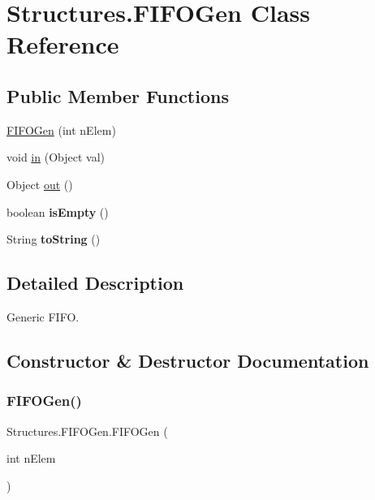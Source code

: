 \hypertarget{class_structures_1_1_f_i_f_o_gen}{}\section{Structures.\+F\+I\+F\+O\+Gen Class Reference}
\label{class_structures_1_1_f_i_f_o_gen}
\subsection*{Public Member Functions}
\begin{DoxyCompactItemize}
\item 
\hyperlink{class_structures_1_1_f_i_f_o_gen_a79132f0c7d3fbecef239a1e6988381a7}{F\+I\+F\+O\+Gen} (int n\+Elem)
\item 
void \hyperlink{class_structures_1_1_f_i_f_o_gen_a8ec114330d8c542df57d58886ecb2196}{in} (Object val)
\item 
Object \hyperlink{class_structures_1_1_f_i_f_o_gen_ac21638f2f22f36450c241d5f5dc665bb}{out} ()
\item 
\mbox{\label{class_structures_1_1_f_i_f_o_gen_a55ae00dc84a01ec42237fa0ea8a088c5}} 
boolean {\bfseries is\+Empty} ()
\item 
\mbox{\label{class_structures_1_1_f_i_f_o_gen_a89179a1589f53d69033309e302df2d4e}} 
String {\bfseries to\+String} ()
\end{DoxyCompactItemize}


\subsection{Detailed Description}
Generic F\+I\+FO. 

\subsection{Constructor \& Destructor Documentation}
\mbox{\label{class_structures_1_1_f_i_f_o_gen_a79132f0c7d3fbecef239a1e6988381a7}} 
\subsubsection{\texorpdfstring{F\+I\+F\+O\+Gen()}{FIFOGen()}}
{\footnotesize\ttfamily Structures.\+F\+I\+F\+O\+Gen.\+F\+I\+F\+O\+Gen (\begin{DoxyParamCaption}\item[{int}]{n\+Elem }\end{DoxyParamCaption})\hspace{0.3cm}{\ttfamily [inline]}}

